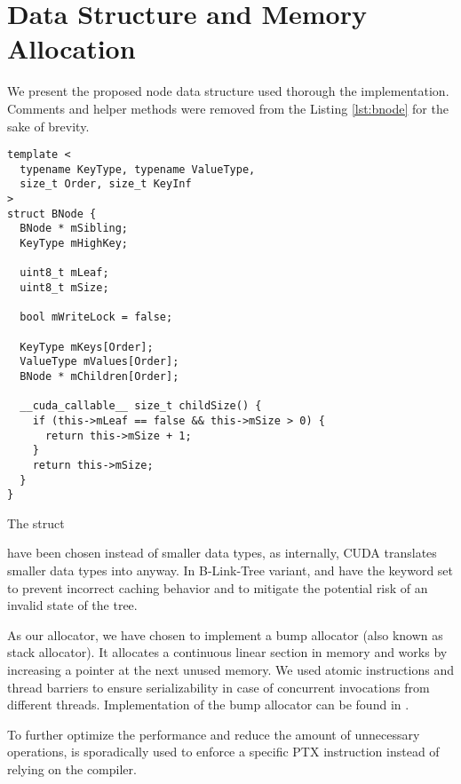 \section{Data Structure and Memory Allocation}

We present the proposed node data structure used thorough the implementation. Comments and helper methods were removed from the Listing \ref{lst:bnode} for the sake of brevity.

\begin{listing}
  \begin{verbatim}
template <
  typename KeyType, typename ValueType,
  size_t Order, size_t KeyInf
>
struct BNode {
  BNode * mSibling;
  KeyType mHighKey;

  uint8_t mLeaf;
  uint8_t mSize;

  bool mWriteLock = false;

  KeyType mKeys[Order];
  ValueType mValues[Order];
  BNode * mChildren[Order]; 

  __cuda_callable__ size_t childSize() {
    if (this->mLeaf == false && this->mSize > 0) {
      return this->mSize + 1;
    }
    return this->mSize;
  }
}
    \end{verbatim}
  \caption{The  struct}\label{lst:bnode}
\end{listing}

 have been chosen instead of smaller data types, as internally, CUDA translates smaller data types into  anyway. In B-Link-Tree variant,  and  have the  keyword set to prevent incorrect caching behavior and to mitigate the potential risk of an invalid state of the tree.

As our allocator, we have chosen to implement a bump allocator (also known as stack allocator). It allocates a continuous linear section in memory and works by increasing a pointer at the next unused memory. We used atomic instructions and thread barriers to ensure serializability in case of concurrent invocations from different threads. Implementation of the bump allocator can be found in .

To further optimize the performance and reduce the amount of unnecessary operations,  is sporadically used to enforce a specific PTX instruction instead of relying on the  compiler.
